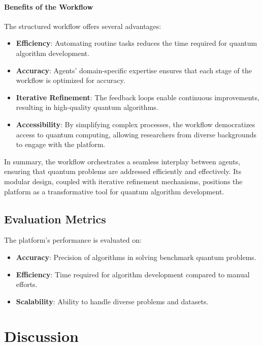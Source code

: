 \documentclass[12pt]{article}
\begin{document}
\paragraph{Benefits of the Workflow}
The structured workflow offers several advantages:
\begin{itemize}
    \item \textbf{Efficiency}: Automating routine tasks reduces the time required for quantum algorithm development.
    \item \textbf{Accuracy}: Agents’ domain-specific expertise ensures that each stage of the workflow is optimized for accuracy.
    \item \textbf{Iterative Refinement}: The feedback loops enable continuous improvements, resulting in high-quality quantum algorithms.
    \item \textbf{Accessibility}: By simplifying complex processes, the workflow democratizes access to quantum computing, allowing researchers from diverse backgrounds to engage with the platform.
\end{itemize}

In summary, the workflow orchestrates a seamless interplay between agents, ensuring that quantum problems are addressed efficiently and effectively. Its modular design, coupled with iterative refinement mechanisms, positions the platform as a transformative tool for quantum algorithm development.


\subsection{Evaluation Metrics}
The platform's performance is evaluated on:
\begin{itemize}
    \item \textbf{Accuracy}: Precision of algorithms in solving benchmark quantum problems.
    \item \textbf{Efficiency}: Time required for algorithm development compared to manual efforts.
    \item \textbf{Scalability}: Ability to handle diverse problems and datasets.
\end{itemize}

\section{Discussion}
\end{document}
